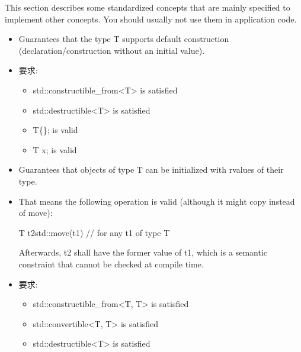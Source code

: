 

This section describes some standardized concepts that are mainly specified to implement other concepts. You should usually not use them in application code.



\begin{itemize}
\item
Guarantees that the type T supports default construction (declaration/construction without an initial value).

\item
要求:
\begin{itemize}
\item
std::constructible\_from<T> is satisfied

\item
std::destructible<T> is satisfied

\item
T\{\}; is valid

\item
T x; is valid
\end{itemize}
\end{itemize}


\begin{itemize}
\item
Guarantees that objects of type T can be initialized with rvalues of their type.

\item
That means the following operation is valid (although it might copy instead of move):

\begin{cpp}
T t2{std::move(t1)} // for any t1 of type T
\end{cpp}

Afterwards, t2 shall have the former value of t1, which is a semantic constraint that cannot be checked at compile time.

\item
要求:
\begin{itemize}
\item
std::constructible\_from<T, T> is satisfied

\item
std::convertible<T, T> is satisfied

\item
std::destructible<T> is satisfied
\end{itemize}
\end{itemize}

